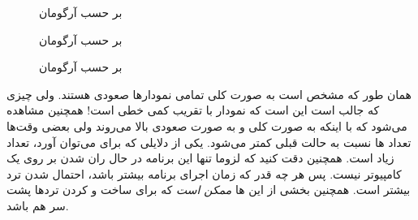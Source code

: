 \begin{figure}[H]
    \centering
    \caption{ بر حسب آرگومان}
\end{figure}
\begin{figure}[H]
    \centering
    \caption{ بر حسب آرگومان}
\end{figure}
\begin{figure}[H]
    \centering
    \caption{ بر حسب آرگومان}
\end{figure}
همان طور که مشخص است به صورت کلی تمامی نمودار‌ها صعودی هستند. ولی چیزی که جالب است
این است که نمودار
با تقریب کمی خطی است! همچنین مشاهده می‌شود که با اینکه به صورت کلی
 و 
به صورت صعودی بالا می‌روند ولی بعضی وقت‌ها تعداد
ها
نسبت به حالت قبلی کمتر می‌شود.
یکی از دلایلی که برای
می‌توان آورد، تعداد زیاد
است. همچنین دقت کنید که لزوما تنها این برنامه در حال ران شدن بر روی یک کامپیوتر نیست.
پس هر چه قدر که زمان اجرای برنامه بیشتر باشد، احتمال
شدن ترد بیشتر است. همچنین بخشی از این
ها
\emph{ممکن است}
که برای ساخت و
کردن ترد‌ها پشت سر هم باشد.

